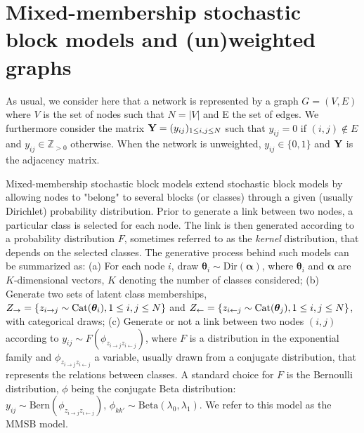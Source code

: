 \section{Mixed-membership stochastic block models and (un)weighted graphs}
\label{sec:model}

As usual, we consider here that a network is represented by a graph $G=(V,E)$ where $V$ is the set of nodes such that $N=|V|$ and E the set of edges. We furthermore consider the matrix $\mathbf{Y}=(y_{ij})_{1 \le i,j \le N}$ such that $y_{ij}=0$ if $(i,j) \notin E$ and $y_{ij} \in \mathbb{Z}_{>0}$ otherwise. When the network is unweighted, $y_{ij} \in \{0,1\}$ and $\mathbf{Y}$ is the adjacency matrix.

Mixed-membership stochastic block models extend stochastic block models \cite{airoldi2009mixed} by allowing nodes to "belong" to several blocks (or classes) through a given (usually Dirichlet) probability distribution. Prior to generate a link between two nodes, a particular class is selected for each node. The link is then generated according to a probability distribution $F$, sometimes referred to as the \textit{kernel} distribution, that depends on the selected classes. The generative process behind such models can be summarized as: (a) For each node $i$, draw $\boldsymbol{\theta}_i \sim \textrm{Dir}(\boldsymbol{\alpha})$, where $\boldsymbol{\theta}_i$ and $\boldsymbol{\alpha}$ are $K$-dimensional vectors, $K$ denoting  the number of classes considered; (b) Generate two sets of latent class memberships, $Z_\rightarrow = \{z_{i\rightarrow j} \sim \textrm{Cat}(\boldsymbol{\theta}_i),  1 \le i,j \le N\}$ and $Z_\leftarrow = \{z_{i\leftarrow j} \sim \textrm{Cat}(\boldsymbol{\theta}_j),  1 \le i,j \le N\}$, with categorical draws; (c) Generate or not a link between two nodes $(i,j)$ according to $y_{ij} \sim F(\phi_{z_{i \rightarrow j}z_{i \leftarrow j}})$, where $F$ is a distribution in the exponential family and $\phi_{z_{i \rightarrow j}z_{i \leftarrow j}}$ a variable, usually drawn from a conjugate distribution, that represents the relations between classes. A standard choice for $F$ is the Bernoulli distribution, $\phi$ being the conjugate Beta distribution: $y_{ij} \sim \textrm{Bern}(\phi_{z_{i \rightarrow j}z_{i \leftarrow j}}), \, \phi_{kk'} \sim \textrm{Beta}(\lambda_0, \lambda_1)$. We refer to this model as the MMSB model.

